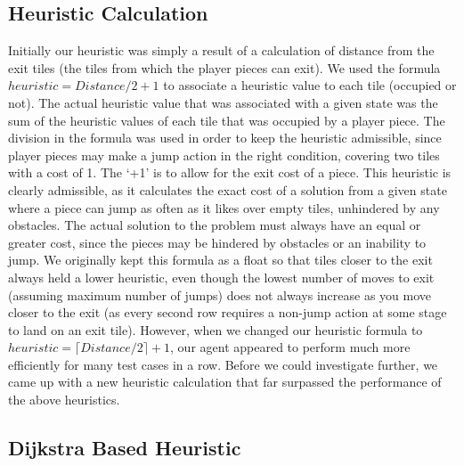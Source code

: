 \documentclass{article}[11pt]
\theoremstyle{plain}
\theoremstyle{definition}
\begin{document}
\subsection{Heuristic Calculation}
Initially our heuristic was simply a result of a calculation of distance from the exit tiles (the tiles from which the player pieces can exit). We used the formula $ heuristic = Distance/2 + 1$ to associate a heuristic value to each tile (occupied or not). The actual heuristic value that was associated with a given state was the sum of the heuristic values of each tile that was occupied by a player piece. The division in the formula was used in order to keep the heuristic admissible, since player pieces may make a jump action in the right condition, covering two tiles with a cost of 1. The ‘+1’ is to allow for the exit cost of a piece. This heuristic is clearly admissible, as it calculates the exact cost of a solution from a given state where a piece can jump as often as it likes over empty tiles, unhindered by any obstacles. The actual solution to the problem must always have an equal or greater cost, since the pieces may be hindered by obstacles or an inability to jump. We originally kept this formula as a float so that tiles closer to the exit always held a lower heuristic, even though the lowest number of moves to exit (assuming maximum number of jumps) does not always increase as you move closer to the exit (as every second row requires a non-jump action at some stage to land on an exit tile). However, when we changed our heuristic formula to $heuristic = \lceil Distance/2 \rceil + 1$, our agent appeared to perform much more efficiently for many test cases in a row. Before we could investigate further, we came up with a new heuristic calculation that far surpassed the performance of the above heuristics.

\pagebreak

\subsection{Dijkstra Based Heuristic}
\end{document}
